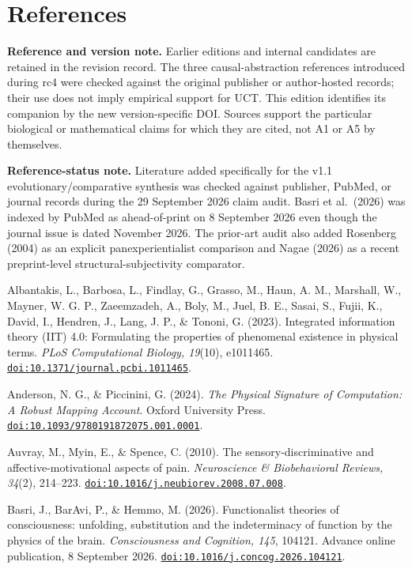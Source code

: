 \documentclass[
  11pt,
  a4paper,
]{article}
\begin{document}
\hypertarget{references}{%
\section{References}\label{references}}

\textbf{Reference and version note.} Earlier editions and internal
candidates are retained in the revision record. The three
causal-abstraction references introduced during rc4 were checked against
the original publisher or author-hosted records; their use does not
imply empirical support for UCT. This edition identifies its companion
by the new version-specific DOI. Sources support the particular
biological or mathematical claims for which they are cited, not A1 or A5
by themselves.

\textbf{Reference-status note.} Literature added specifically for the
v1.1 evolutionary/comparative synthesis was checked against publisher,
PubMed, or journal records during the 29 September 2026 claim audit.
Basri et al.~(2026) was indexed by PubMed as ahead-of-print on 8
September 2026 even though the journal issue is dated November 2026. The
prior-art audit also added Rosenberg (2004) as an explicit
panexperientialist comparison and Nagae (2026) as a recent
preprint-level structural-subjectivity comparator.

Albantakis, L., Barbosa, L., Findlay, G., Grasso, M., Haun, A. M.,
Marshall, W., Mayner, W. G. P., Zaeemzadeh, A., Boly, M., Juel, B. E.,
Sasai, S., Fujii, K., David, I., Hendren, J., Lang, J. P., \& Tononi, G.
(2023). Integrated information theory (IIT) 4.0: Formulating the
properties of phenomenal existence in physical terms. \emph{PLoS
Computational Biology, 19}(10), e1011465.
\href{https://doi.org/10.1371/journal.pcbi.1011465}{\nolinkurl{doi:10.1371/journal.pcbi.1011465}}.

Anderson, N. G., \& Piccinini, G. (2024). \emph{The Physical Signature
of Computation: A Robust Mapping Account}. Oxford University Press.
\href{https://doi.org/10.1093/9780191872075.001.0001}{\nolinkurl{doi:10.1093/9780191872075.001.0001}}.

Auvray, M., Myin, E., \& Spence, C. (2010). The sensory-discriminative
and affective-motivational aspects of pain. \emph{Neuroscience \&
Biobehavioral Reviews, 34}(2), 214--223.
\href{https://doi.org/10.1016/j.neubiorev.2008.07.008}{\nolinkurl{doi:10.1016/j.neubiorev.2008.07.008}}.

Basri, J., BarAvi, P., \& Hemmo, M. (2026). Functionalist theories of
consciousness: unfolding, substitution and the indeterminacy of function
by the physics of the brain. \emph{Consciousness and Cognition, 145},
104121. Advance online publication, 8 September 2026.
\href{https://doi.org/10.1016/j.concog.2026.104121}{\nolinkurl{doi:10.1016/j.concog.2026.104121}}.
\end{document}
